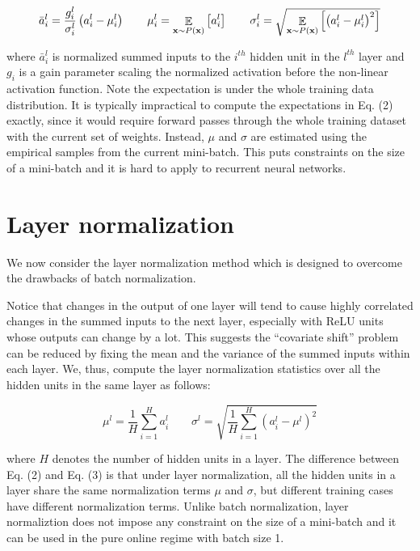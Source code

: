 \begin{equation}
\bar{a}^l_i = {{g}^l_i\over\sigma^l_i}\left({a}^l_i - \mu^l_i \right)
\qquad
\mu^l_i = \mathop{\mathbb{E}}_{{\bold x} \sim P({\bold x})} \left[ {a}^l_i \right]
\qquad
\sigma^l_i = \sqrt{\mathop{\mathbb{E}}_{{\bold x} \sim P({\bold x})} \left[\left( {a}^l_i  - \mu^l_i \right)^2\right]}
\label{eq:bn}
\end{equation}

where $\bar{a}^l_i$ is normalized summed inputs to the $i^{th}$ hidden unit in the $l^{th}$ layer and $g_i$ is a gain parameter scaling the normalized activation before the non-linear activation function. Note the expectation is under the whole training data distribution.  It is typically impractical to compute the expectations in Eq. (2) exactly, since it would require forward passes through the whole training dataset with the current set of weights.  Instead, $\mu$ and $\sigma$ are estimated using the empirical samples from the current mini-batch. This puts constraints on the size of a mini-batch and it is hard to apply to recurrent neural networks.

\section{Layer normalization}

We now consider the layer normalization method which is designed to overcome the drawbacks of batch normalization. 

Notice that changes in the output of one layer will tend to cause highly correlated changes in the summed inputs to the next layer, especially with ReLU units whose outputs can change by a lot. This suggests the ``covariate shift'' problem can be reduced by fixing the mean and the variance of the summed inputs within each layer. We, thus, compute the layer normalization statistics over all the hidden units in the same layer as follows:

\begin{equation}
\mu^l = \frac{1}{H}\sum_{i = 1}^H  {a}^l_i
\qquad
\sigma^l = \sqrt{\frac{1}{H}\sum_{i = 1}^H  \left( {a}^l_i  - \mu^l \right)^2}
\label{eq:ln}
\end{equation}

where $H$ denotes the number of hidden units in a layer. The difference between Eq. (2) and Eq. (3) is that under layer normalization, all the hidden units in a layer share the same normalization terms $\mu$ and $\sigma$, but different training cases have different normalization terms. Unlike batch normalization, layer normaliztion does not impose any constraint on the size of a mini-batch and it can be used in the pure online regime with batch size 1. 

